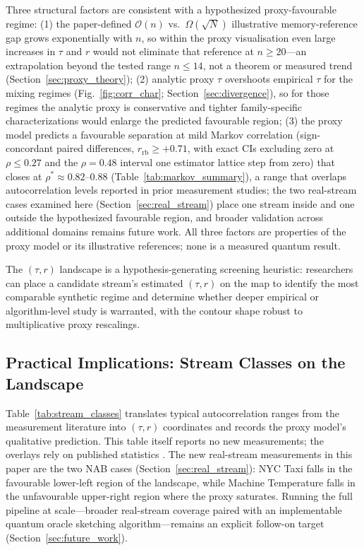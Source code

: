 \documentclass[sensors,article,submit,pdftex,moreauthors]{Definitions/mdpi}
\newcommand{\bigO}{\mathcal{O}}
\begin{document}
Three structural factors are consistent with a hypothesized proxy-favourable regime: (1) the paper-defined $\bigO(n)$ vs.\ $\Omega(\sqrt{N})$ illustrative memory-reference gap grows exponentially with $n$, so within the proxy visualisation even large increases in $\tau$ and $r$ would not eliminate that reference at $n \geq 20$---an extrapolation beyond the tested range $n \leq 14$, not a theorem or measured trend (Section~\ref{sec:proxy_theory}); (2) analytic proxy $\tau$ overshoots empirical $\tau$ for the mixing regimes (Fig.~\ref{fig:corr_char}; Section~\ref{sec:divergence}), so for those regimes the analytic proxy is conservative and tighter family-specific characterizations would enlarge the predicted favourable region; (3) the proxy model predicts a favourable separation at mild Markov correlation (sign-concordant paired differences, $r_{\mathrm{rb}} \geq +0.71$, with exact CIs excluding zero at $\rho \leq 0.27$ and the $\rho = 0.48$ interval one estimator lattice step from zero) that closes at $\rho^{*} \approx 0.82$--$0.88$ (Table~\ref{tab:markov_summary}), a range that overlaps autocorrelation levels reported in prior measurement studies; the two real-stream cases examined here (Section~\ref{sec:real_stream}) place one stream inside and one outside the hypothesized favourable region, and broader validation across additional domains remains future work. All three factors are properties of the proxy model or its illustrative references; none is a measured quantum result.

The $(\tau, r)$ landscape is a hypothesis-generating screening heuristic: researchers can place a candidate stream's estimated $(\tau, r)$ on the map to identify the most comparable synthetic regime and determine whether deeper empirical or algorithm-level study is warranted, with the contour shape robust to multiplicative proxy rescalings.

\subsection{Practical Implications: Stream Classes on the Landscape}
\label{sec:practical_impl}

Table~\ref{tab:stream_classes} translates typical autocorrelation ranges from the measurement literature into $(\tau, r)$ coordinates and records the proxy model's qualitative prediction. This table itself reports no new measurements; the overlays rely on published statistics \citep{leland1994ethernet,willinger1997selfsimilarity,beran1994statistics,su2024elasticonline,yan2024bidynamic,gama2014driftsurvey,arora2024driftreview}. The new real-stream measurements in this paper are the two NAB cases (Section~\ref{sec:real_stream}): NYC Taxi falls in the favourable lower-left region of the landscape, while Machine Temperature falls in the unfavourable upper-right region where the proxy saturates. Running the full pipeline at scale---broader real-stream coverage paired with an implementable quantum oracle sketching algorithm---remains an explicit follow-on target (Section~\ref{sec:future_work}).
\end{document}
